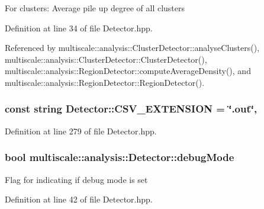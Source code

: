 For clusters\-: Average pile up degree of all clusters 

Definition at line 34 of file Detector.\-hpp.



Referenced by multiscale\-::analysis\-::\-Cluster\-Detector\-::analyse\-Clusters(), multiscale\-::analysis\-::\-Cluster\-Detector\-::\-Cluster\-Detector(), multiscale\-::analysis\-::\-Region\-Detector\-::compute\-Average\-Density(), and multiscale\-::analysis\-::\-Region\-Detector\-::\-Region\-Detector().

\hypertarget{classmultiscale_1_1analysis_1_1Detector_a5458417daa8430ea8ebbe1c25cb26f41}{
\subsubsection[{C\-S\-V\-\_\-\-E\-X\-T\-E\-N\-S\-I\-O\-N}]{\setlength{\rightskip}{0pt plus 5cm}const string Detector\-::\-C\-S\-V\-\_\-\-E\-X\-T\-E\-N\-S\-I\-O\-N = \char`\"{}.out\char`\"{}\hspace{0.3cm}{\ttfamily [static]}, {\ttfamily [protected]}}}\label{classmultiscale_1_1analysis_1_1Detector_a5458417daa8430ea8ebbe1c25cb26f41}


Definition at line 279 of file Detector.\-hpp.

\hypertarget{classmultiscale_1_1analysis_1_1Detector_a4b42f796957efd6ee0b8cf7645494a65}{
\subsubsection[{debug\-Mode}]{\setlength{\rightskip}{0pt plus 5cm}bool multiscale\-::analysis\-::\-Detector\-::debug\-Mode\hspace{0.3cm}{\ttfamily [protected]}}}\label{classmultiscale_1_1analysis_1_1Detector_a4b42f796957efd6ee0b8cf7645494a65}
Flag for indicating if debug mode is set 

Definition at line 42 of file Detector.\-hpp.

